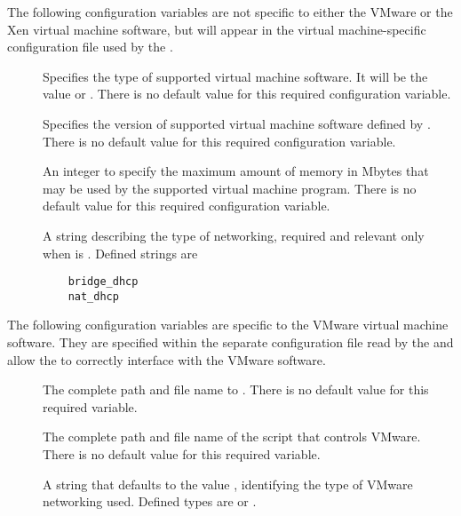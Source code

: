 The following configuration variables are not specific to either the VMware
or the Xen virtual machine software, but will appear in the
virtual machine-specific configuration file used by the .

\begin{description}

\item[]
  \label{param:VMType}
  Specifies the type of supported virtual machine software.
  It will be the value \verb@xen@ or \verb@vmware@.
  There is no default value for this required configuration variable.

\item[]
  \label{param:VMVersion}
  Specifies the version of supported virtual machine software
  defined by .
  There is no default value for this required configuration variable.

\item[]
  \label{param:VMMaxMemory}
  An integer to specify the maximum amount of memory in Mbytes
  that may be used by the supported virtual machine program.
  There is no default value for this required configuration variable.

\item[]
  \label{param:VMNetworkingType}
  A string describing the type of networking,
  required and relevant only when  is .
  Defined strings are
  \begin{verbatim}
    bridge_dhcp
    nat_dhcp
  \end{verbatim}

\end{description}

The following configuration variables are specific to the VMware
virtual machine software.  They are specified within the separate configuration
file read by the  and allow the  to
correctly interface with the VMware software.

\begin{description}
\item[]
  \label{param:VMwarePerl}
  The complete path and file name to .
  There is no default value for this required variable.

\item[]
  \label{param:VMwareScript}
  The complete path and file name of the script that controls VMware.
  There is no default value for this required variable.

\item[]
  \label{param:VMwareNetworkingType}
  A string that defaults to the value \verb@nat@,
  identifying the type of VMware networking used.
  Defined types are \verb@nat@ or \verb@bridged@.
\end{description}

